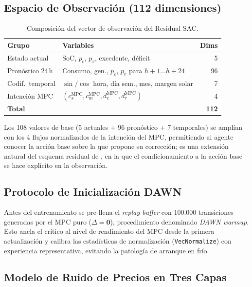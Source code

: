 \documentclass[12pt, a4paper, twoside]{report}
\begin{document}
\subsection{Espacio de Observación (112 dimensiones)}
\label{sub:observacion}

\begin{table}[H]
\centering
\caption{Composición del vector de observación del Residual SAC.}
\label{tab:obs}
\begin{tabular}{llr}
\toprule
\textbf{Grupo} & \textbf{Variables} & \textbf{Dims} \\
\midrule
Estado actual & SoC, $p_c$, $p_v$, excedente, déficit & 5 \\
Pronóstico 24\,h & Consumo, gen., $p_c$, $p_v$ para $h{+}1\ldots h{+}24$ & 96 \\
Codif.\ temporal & $\sin/\cos$ hora, día sem., mes, margen solar & 7 \\
Intención MPC & $(c_s^{\text{MPC}}, c_m^{\text{MPC}}, d_c^{\text{MPC}}, d_r^{\text{MPC}})$ & 4 \\
\midrule
\textbf{Total} & & \textbf{112} \\
\bottomrule
\end{tabular}
\end{table}

Los 108 valores de base (5 actuales + 96 pronóstico + 7 temporales) se amplían
con los 4 flujos normalizados de la intención del MPC, permitiendo al agente
conocer la acción base sobre la que propone su corrección; es una extensión
natural del esquema residual de \citet{Johannink2019}, en la que el
condicionamiento a la acción base se hace explícito en la observación.

\subsection{Protocolo de Inicialización DAWN}
\label{sub:dawn}

Antes del entrenamiento se pre-llena el \textit{replay buffer} con 100.000
transiciones generadas por el MPC puro ($\Delta = \mathbf{0}$), procedimiento
denominado \textit{DAWN warmup}. Esto ancla el crítico al nivel de rendimiento
del MPC desde la primera actualización y calibra las estadísticas de
normalización (\texttt{VecNormalize}) con experiencia representativa, evitando
la patología de arranque en frío.

\subsection{Modelo de Ruido de Precios en Tres Capas}
\label{sub:ruido}
\end{document}
